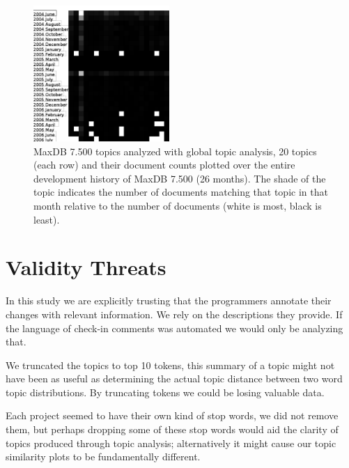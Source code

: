 \documentclass[times, 10pt,twocolumn]{article}
\newcommand{\shrinkit}{\vspace*{-.3em}}
\begin{document}
\begin{figure}
  \centering
  \includegraphics[width=0.46\textwidth]{month}
  \caption{MaxDB 7.500 topics analyzed with global topic analysis, 20
    topics (each row) and their document counts plotted over the
    entire development history of MaxDB 7.500 (26 months). The shade
    of the topic indicates the number of documents matching that topic
    in that month relative to the number of documents (white is most,
    black is least).}
  \label{fig:statictopics}
\end{figure}




\shrinkit
\section{Validity Threats}
\shrinkit

In this study we are explicitly trusting that the programmers annotate
their changes with relevant information. We rely on the descriptions
they provide. If the language of check-in comments was automated we
would only be analyzing that.

We truncated the topics to top 10 tokens, this summary of a topic
might not have been as useful as determining the actual topic distance
between two word topic distributions. By truncating tokens we could be
losing valuable data.

Each project seemed to have their own kind of stop words, we did not
remove them, but perhaps dropping some of these stop words would aid
the clarity of topics produced through topic analysis; alternatively
it might cause our topic similarity plots to be fundamentally
different.
\end{document}
